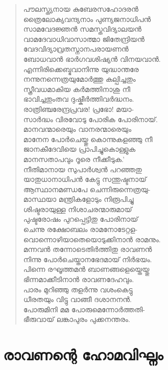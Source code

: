 \begin{verse}
പൗലസ്ത്യനായ കുബേരസഹോദരന്‍\\
ത്രൈലോക്യവന്ദ്യനാം പുണ്യജനാധിപന്‍\\
സാമവേദജ്ഞന്‍ സമസ്തവിദ്യാലയന്‍\\
വാമദേവാധിവാസാത്മാ ജിതേന്ദ്രിയന്‍\\
വേദവിദ്യാവ്രതസ്നാനപരായണന്‍\\
ബോധവാന്‍ ഭാര്‍ഗവശിഷ്യന്‍ വിനയവാന്‍.\\
എന്നിരിക്കെബ്ഭവാനിന്നു യുദ്ധാന്തരേ\\
നന്നുനന്നെത്രയുമോര്‍ത്തു കല്പിച്ചതും\\
സ്ത്രീവധമാകിയ കര്‍മത്തിനാശു നീ\\
ഭാവിച്ചതുംതവ ദുഷ്കീര്‍ത്തിവര്‍ദ്ധനം.\\
രാത്രിഞ്ചരേന്ദ്രപ്രവര! പ്രഭോ! മയാ-\\
സാര്‍ദ്ധം വിരവോടു പോരിക പോരിനായ്.\\
മാനവന്മാരെയും വാനരന്മാരെയും\\
മാനേന പോര്‍ചെയ്തു കൊന്നുകളഞ്ഞു നീ\\
ജാനകീദേവിയെ പ്രാപിച്ചുകൊള്ളുക\\
മാനസതാപവും ദൂരെ നീക്കീടുക.’\\
നീതിമാനായ സുപാര്‍ശ്വന്‍ പറഞ്ഞതു\\
യാതുധാനാധിപന്‍ കേട്ടു സന്തുഷ്ടനായ്\\
ആസ്ഥാനമണ്ഡപേ ചെന്നിരുന്നെത്രയു-\\
മാസ്ഥയാ മന്ത്രികളോടും നിരൂപിച്ചു\\
ശിഷ്ടരായുള്ള നിശാചരന്മാരുമായ്\\
പുഷ്ടരോഷം പുറപ്പെട്ടിതു പോരിനായ്\\
ചെന്നു രക്ഷോബലം രാമനോടേറ്റള-\\
വൊന്നൊഴിയാതെയൊടുക്കിനാന്‍ രാമനും.\\
മന്നവന്‍ തന്നോടെതിര്‍ത്തിതു രാവണന്‍\\
നിന്നു പോര്‍ചെയ്താനഭേദമായ് നിര്‍ഭയം.\\
പിന്നെ രഘൂത്തമന്‍ ബാണങ്ങളെയ്തെയ്തു\\
ഭിന്നമാക്കീടിനാന്‍ രാവണദേഹവും.\\
പാരം മുറിഞ്ഞു തളര്‍ന്നു വശംകെട്ടു\\
ധീരതയും വിട്ടു വാങ്ങീ ദശാനനന്‍.\\
പോരുമിനി മമ പോരുമെന്നോര്‍ത്തതി-\\
ഭീരുവായ് ലങ്കാപുരം പുക്കനന്തരം.
\end{verse}


\section{രാവണന്റെ ഹോമവിഘ്നം}

